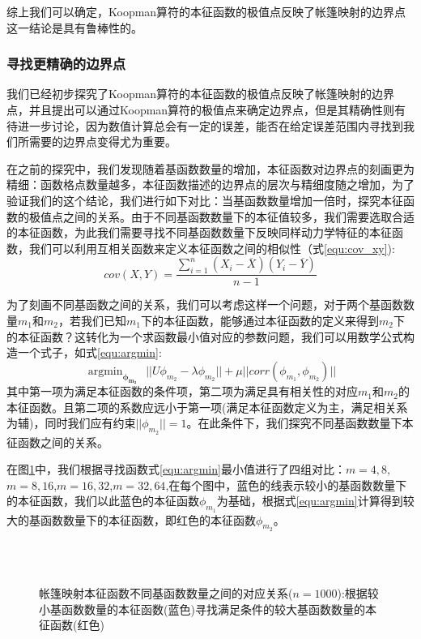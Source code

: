 综上我们可以确定，Koopman算符的本征函数的极值点反映了帐篷映射的边界点这一结论是具有鲁棒性的。

\subsubsection{寻找更精确的边界点}
我们已经初步探究了Koopman算符的本征函数的极值点反映了帐篷映射的边界点，并且提出可以通过Koopman算符的极值点来确定边界点，但是其精确性则有待进一步讨论，因为数值计算总会有一定的误差，能否在给定误差范围内寻找到我们所需要的边界点变得尤为重要。

在之前的探究中，我们发现随着基函数数量的增加，本征函数对边界点的刻画更为精细：函数格点数量越多，本征函数描述的边界点的层次与精细度随之增加，为了验证我们的这个结论，我们进行如下对比：当基函数数量增加一倍时，探究本征函数的极值点之间的关系。由于不同基函数数量下的本征值较多，我们需要选取合适的本征函数，为此我们需要寻找不同基函数数量下反映同样动力学特征的本征函数，我们可以利用互相关函数\cite{gailulun2008}来定义本征函数之间的相似性（式\ref{equ:cov_xy}):
\begin{equation}
  cov(X,Y)=\dfrac{\sum_{i=1}^{n}(X_i-\overline{X})(Y_i-\overline{Y})}{n-1}
  \label{equ:cov_xy}
\end{equation}

为了刻画不同基函数之间的关系，我们可以考虑这样一个问题，对于两个基函数数量$m_1$和$m_2$，若我们已知$m_1$下的本征函数，能够通过本征函数的定义来得到$m_2$下的本征函数？这转化为一个求函数最小值对应的参数问题，我们可以用数学公式构造一个式子，如式\ref{equ:argmin}:
\begin{equation}
  \mathop{\arg\min}_{\boldsymbol{\phi_{m_2}}} \ \ || U\phi_{m_2}-\lambda \phi_{m_2} || + \mu ||corr(\phi_{m_1},\phi_{m_2})||
  \label{equ:argmin}
\end{equation}
其中第一项为满足本征函数的条件项，第二项为满足具有相关性的对应$m_1$和$m_2$的本征函数。且第二项的系数应远小于第一项(满足本征函数定义为主，满足相关系为辅)，同时我们应有约束$||\phi_{m_2}||=1$。在此条件下，我们探究不同基函数数量下本征函数之间的关系。

在图\ref{fig:Tent_findeigen_m8m16}中，我们根据寻找函数式\ref{equ:argmin}最小值进行了四组对比：$m=4,8$,$m=8,16$,$m=16,32$,$m=32,64$,在每个图中，蓝色的线表示较小的基函数数量下的本征函数，我们以此蓝色的本征函数$\phi_{m_1}$为基础，根据式\ref{equ:argmin}计算得到较大的基函数数量下的本征函数，即红色的本征函数$\phi_{m_2}$。

\begin{figure}[!]
  \centering
    \\
    \\
  \caption[帐篷映射本征函数不同基函数数量之间的对应关系]{帐篷映射本征函数不同基函数数量之间的对应关系($n=1000$):根据较小基函数数量的本征函数(蓝色)寻找满足条件的较大基函数数量的本征函数(红色)}\label{fig:Tent_findeigen_m8m16}
\end{figure}

